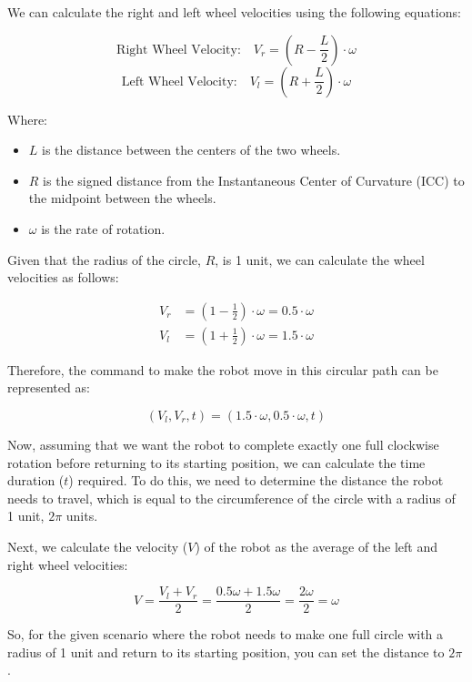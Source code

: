 \documentclass[answers]{exam}
\begin{document}
\begin{questions}
\begin{parts}
\begin{solution}
            We can calculate the right and left wheel velocities using the following
            equations:

            \[\text{Right Wheel Velocity:} \quad V_r = (R - \frac{L}{2}) \cdot \omega\]
            \[\text{Left Wheel Velocity:} \quad V_l = (R + \frac{L}{2}) \cdot \omega\]

            Where:
            \begin{itemize}
                \item \(L\) is the distance between the centers of the two wheels.
                \item \(R\) is the signed distance from the Instantaneous Center of Curvature (ICC) to the midpoint between the wheels.
                \item \(\omega\) is the rate of rotation.
            \end{itemize}

            Given that the radius of the circle, \(R\), is 1 unit, we can calculate the
            wheel velocities as follows:

            \begin{align*}
                V_r & = (1 - \frac{1}{2}) \cdot \omega = 0.5 \cdot \omega \\
                V_l & = (1 + \frac{1}{2}) \cdot \omega = 1.5 \cdot \omega
            \end{align*}

            Therefore, the command to make the robot move in this circular path can be
            represented as:

            \[(V_l, V_r, t) = (1.5\cdot\omega, 0.5\cdot\omega, t)\]

            Now, assuming that we want the robot to complete exactly one full clockwise
            rotation before returning to its starting position, we can calculate the time
            duration (\(t\)) required. To do this, we need to determine the distance the
            robot needs to travel, which is equal to the circumference of the circle with a
            radius of 1 unit, \(2\pi\) units.

            Next, we calculate the velocity (\(V\)) of the robot as the average of the left
            and right wheel velocities:

            \[V = \frac{V_l + V_r}{2} = \frac{0.5\omega + 1.5\omega}{2} = \frac{2\omega}{2} = \omega\]

            So, for the given scenario where the robot needs to make one full circle with a
            radius of 1 unit and return to its starting position, you can set the distance
            to \(2\pi\).


\end{solution}
\end{parts}
\end{questions}
\end{document}
